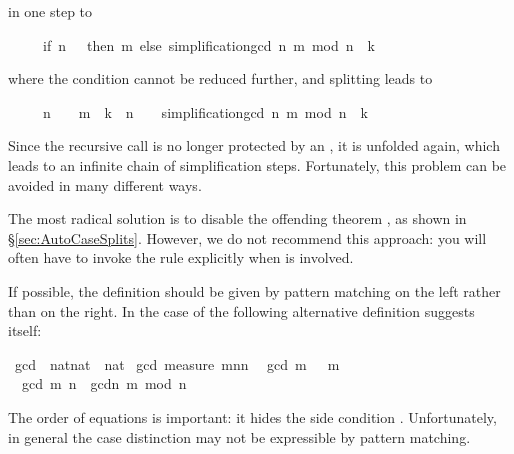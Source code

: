 \begin{isabellebody}
\begin{isamarkuptext}
\begin{isabelle}
\end{isabelle}
in one step to
\begin{isabelle}%
\ \ \ \ \ {\isacharparenleft}if\ n\ {\isacharequal}\ {}\ then\ m\ else\ simplification{\isachardot}gcd\ {\isacharparenleft}n{\isacharcomma}\ m\ mod\ n{\isacharparenright}{\isacharparenright}\ {\isacharequal}\ k%
\end{isabelle}
where the condition cannot be reduced further, and splitting leads to
\begin{isabelle}%
\ \ \ \ \ {\isacharparenleft}n\ {\isacharequal}\ {}\ {\isasymlongrightarrow}\ m\ {\isacharequal}\ k{\isacharparenright}\ {\isasymand}\ {\isacharparenleft}n\ {\isasymnoteq}\ {}\ {\isasymlongrightarrow}\ simplification{\isachardot}gcd\ {\isacharparenleft}n{\isacharcomma}\ m\ mod\ n{\isacharparenright}\ {\isacharequal}\ k{\isacharparenright}%
\end{isabelle}
Since the recursive call  is no longer protected by
an , it is unfolded again, which leads to an infinite chain of
simplification steps. Fortunately, this problem can be avoided in many
different ways.

The most radical solution is to disable the offending theorem
,
as shown in \S\ref{sec:AutoCaseSplits}.  However, we do not recommend this
approach: you will often have to invoke the rule explicitly when
 is involved.

If possible, the definition should be given by pattern matching on the left
rather than  on the right. In the case of  the
following alternative definition suggests itself:%
\end{isamarkuptext}%
\isamarkuptrue%
\isamarkupfalse%
\ gcd{}\ {\isacharcolon}{\isacharcolon}\ {\isachardoublequoteopen}nat{\isasymtimes}nat\ {\isasymRightarrow}\ nat{\isachardoublequoteclose}\isanewline
{}\isamarkupfalse%
\ gcd{}\ {\isachardoublequoteopen}measure\ {\isacharparenleft}{\isasymlambda}{\isacharparenleft}m{\isacharcomma}n{\isacharparenright}{\isachardot}n{\isacharparenright}{\isachardoublequoteclose}\isanewline
\ \ {\isachardoublequoteopen}gcd{}\ {\isacharparenleft}m{\isacharcomma}\ {}{\isacharparenright}\ {\isacharequal}\ m{\isachardoublequoteclose}\isanewline
\ \ {\isachardoublequoteopen}gcd{}\ {\isacharparenleft}m{\isacharcomma}\ n{\isacharparenright}\ {\isacharequal}\ gcd{}{\isacharparenleft}n{\isacharcomma}\ m\ mod\ n{\isacharparenright}{\isachardoublequoteclose}%
\begin{isamarkuptext}%
\noindent
The order of equations is important: it hides the side condition
.  Unfortunately, in general the case distinction
may not be expressible by pattern matching.


\end{isamarkuptext}
\end{isabellebody}
